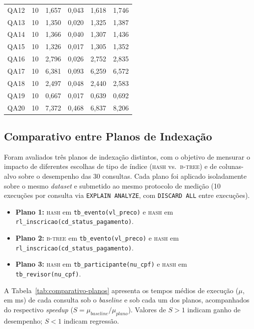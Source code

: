 \documentclass[12pt]{article}
\begin{document}
\begin{longtable}{|c|c|r|r|r|r|}
QA12 & 10 & 1,657 & 0,043 & 1,618 & 1,746 \\
QA13 & 10 & 1,350 & 0,020 & 1,325 & 1,387 \\
QA14 & 10 & 1,366 & 0,040 & 1,307 & 1,436 \\
QA15 & 10 & 1,326 & 0,017 & 1,305 & 1,352 \\
QA16 & 10 & 2,796 & 0,026 & 2,752 & 2,835 \\
QA17 & 10 & 6,381 & 0,093 & 6,259 & 6,572 \\
QA18 & 10 & 2,497 & 0,048 & 2,440 & 2,583 \\
QA19 & 10 & 0,667 & 0,017 & 0,639 & 0,692 \\
QA20 & 10 & 7,372 & 0,468 & 6,837 & 8,206 \\
\hline
\end{longtable}

\subsection{Comparativo entre Planos de Indexação}
\label{subsec:comparativo-planos}

Foram avaliados três planos de indexação distintos, com o objetivo de mensurar o
impacto de diferentes escolhas de tipo de índice (\textsc{hash} vs.\ \textsc{b-tree})
e de colunas-alvo sobre o desempenho das 30 consultas. Cada plano foi aplicado
isoladamente sobre o mesmo \emph{dataset} e submetido ao mesmo protocolo de
medição (10 execuções por consulta via \texttt{EXPLAIN ANALYZE}, com
\texttt{DISCARD ALL} entre execuções).

\begin{itemize}[leftmargin=2cm]
    \item \textbf{Plano 1:} \textsc{hash} em \texttt{tb\_evento(vl\_preco)} e
          \textsc{hash} em \texttt{rl\_inscricao(cd\_status\_pagamento)}.
    \item \textbf{Plano 2:} \textsc{b-tree} em \texttt{tb\_evento(vl\_preco)} e
          \textsc{hash} em \texttt{rl\_inscricao(cd\_status\_pagamento)}.
    \item \textbf{Plano 3:} \textsc{hash} em \texttt{tb\_participante(nu\_cpf)} e
          \textsc{hash} em \texttt{tb\_revisor(nu\_cpf)}.
\end{itemize}

A Tabela~\ref{tab:comparativo-planos} apresenta os tempos médios de execução
($\mu$, em ms) de cada consulta sob o \emph{baseline} e sob cada um dos planos,
acompanhados do respectivo \emph{speedup} ($S = \mu_{baseline}/\mu_{plano}$).
Valores de $S > 1$ indicam ganho de desempenho; $S < 1$ indicam regressão.
\end{document}

